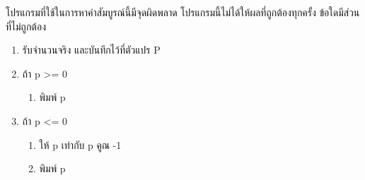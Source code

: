 \question โปรแกรมที่ใช้ในการหาค่าสัมบูรณ์นี้มีจุดผิดพลาด โปรแกรมนี้ไม่ได้ให้ผลที่ถูกต้องทุกครั้ง ข้อใดมีส่วนที่ไม่ถูกต้อง
\begin{pseudocode}
\begin{enumerate}
    \item รับจำนวนจริง และบันทึกไว้ที่ตัวแปร P 
    \item ถ้า p >= 0
    \begin{enumerate}
        \item พิมพ์ p
    \end{enumerate}
    \item ถ้า p <= 0
    \begin{enumerate}
        \item ให้ p เท่ากับ p คูณ -1
        \item พิมพ์ p
    \end{enumerate}
\end{enumerate}
\end{pseudocode}
